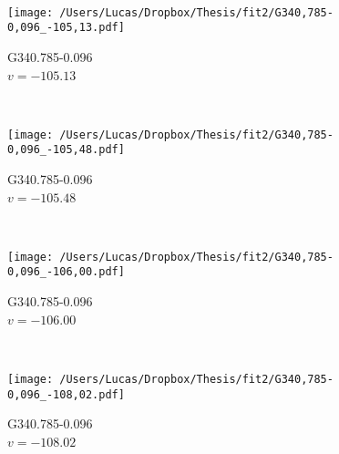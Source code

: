 \begin{figure*}[t]
\begin{subfigure}[t]{0.3\textwidth}
	\end{subfigure}
	~
	\begin{subfigure}[t]{0.3\textwidth}
		\texttt{[image: /Users/Lucas/Dropbox/Thesis/fit2/G340,785-0,096\_-105,13.pdf]}
		\caption[]{G340.785-0.096\\$v=-105.13$\,\kms}
	\end{subfigure}
	~
	\begin{subfigure}[t]{0.3\textwidth}
		\texttt{[image: /Users/Lucas/Dropbox/Thesis/fit2/G340,785-0,096\_-105,48.pdf]}
		\caption[]{G340.785-0.096\\$v=-105.48$\,\kms}
	\end{subfigure}
	~
	\begin{subfigure}[t]{0.3\textwidth}
		\texttt{[image: /Users/Lucas/Dropbox/Thesis/fit2/G340,785-0,096\_-106,00.pdf]}
		\caption[]{G340.785-0.096\\$v=-106.00$\,\kms}
	\end{subfigure}
	~
	\begin{subfigure}[t]{0.3\textwidth}
		\texttt{[image: /Users/Lucas/Dropbox/Thesis/fit2/G340,785-0,096\_-108,02.pdf]}
		\caption[]{G340.785-0.096\\$v=-108.02$\,\kms}
	\end{subfigure}
	~
\end{figure*}
\clearpage
